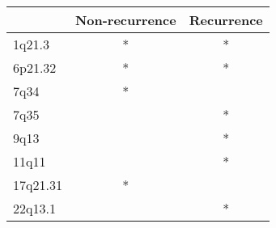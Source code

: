 \begin{tabular}{lcc}
\toprule
{} & Non-recurrence & Recurrence \\
\midrule
1q21.3   &              * &          * \\
6p21.32  &              * &          * \\
7q34     &              * &            \\
7q35     &                &          * \\
9q13     &                &          * \\
11q11    &                &          * \\
17q21.31 &              * &            \\
22q13.1  &                &          * \\
\bottomrule
\end{tabular}
